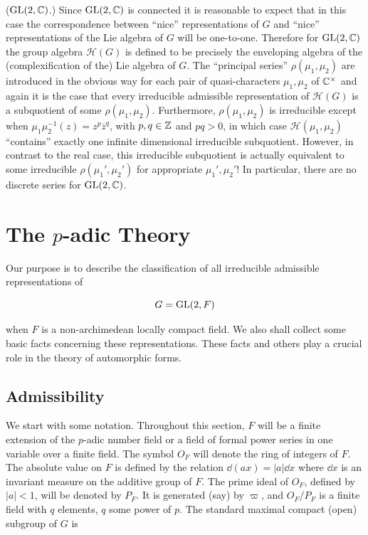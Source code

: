 \begin{remark}\label{rem:4.8}

(\ensuremath{\GL(2,\C)}.) Since $\operatorname{GL}(2,\mathbb{C})$ is connected it is reasonable to expect that in this case the correspondence between ``nice'' representations of $G$ and ``nice'' representations of the Lie algebra of $G$ will be one-to-one. Therefore for $\operatorname{GL}(2,\mathbb{C})$ the group algebra $\mathcal{H}(G)$ is defined to be precisely the enveloping algebra of the (complexification of the) Lie algebra of $G$. The ``principal series'' $\rho(\mu_1, \mu_2)$ are introduced in the obvious way for each pair of quasi-characters $\mu_1, \mu_2$ of $\mathbb{C}^{\times}$ and again it is the case that every irreducible admissible representation of $\mathcal{H}(G)$ is a subquotient of some $\rho(\mu_1, \mu_2)$. Furthermore, $\rho(\mu_1, \mu_2)$ is irreducible except when $\mu_1\mu_2^{-1}(z) = z^p\overline{z}^q$, with $p, q \in \mathbb{Z}$ and $pq > 0$, in which case $\mathcal{H}(\mu_1, \mu_2)$ ``contains'' exactly one infinite dimensional irreducible subquotient. However, in contrast to the real case, this irreducible subquotient is actually equivalent to some irreducible $\rho(\mu_1', \mu_2')$ for appropriate $\mu_1', \mu_2'$! In particular, there are no discrete series for $\operatorname{GL}(2,\mathbb{C})$.

\end{remark}

\section{The \texorpdfstring{$p$}{p}-adic Theory}\label{sec:4b}

Our purpose is to describe the classification of all irreducible admissible representations of

\[
G = \operatorname{GL}(2,F)
\]

when $F$ is a non-archimedean locally compact field. We also shall collect some basic facts concerning these representations. These facts and others play a crucial role in the theory of automorphic forms.

\subsection{Admissibility}

We start with some notation. Throughout this section, $F$ will be a finite extension of the $p$-adic number field or a field of formal power series in one variable over a finite field. The symbol $O_F$ will denote the ring of integers of $F$. The absolute value on $F$ is defined by the relation $\dd(ax) = |a|\dd x$ where $\dd x$ is an invariant measure on the additive group of $F$. The prime ideal of $O_F$, defined by $|a| < 1$, will be denoted by $P_F$. It is generated (say) by $\varpi$, and $O_F/P_F$ is a finite field with $q$ elements, $q$ some power of $p$. The standard maximal compact (open) subgroup of $G$ is

